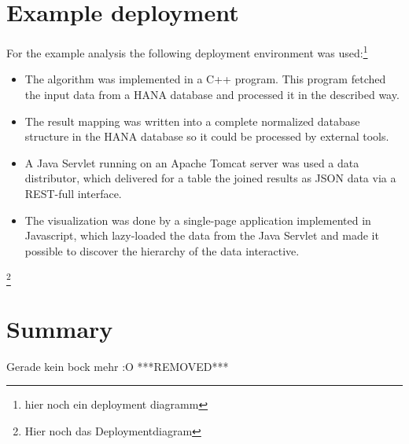 \documentclass[10pt, journal, twocolumn]{IEEEtran}
\begin{document}
\section{Example deployment}
For the example analysis the following deployment environment was used:\footnote{hier noch ein deployment diagramm}
\begin{itemize}
\item The algorithm was implemented in a C++ program. This program fetched the input data from a HANA database and processed it in the described way.
\item The result mapping was written into a complete normalized database structure in the HANA database so it could be processed by external tools.
\item A Java Servlet running on an Apache Tomcat server was used a data distributor, which delivered for a table the joined results as JSON data via a REST-full interface.
\item The visualization was done by a single-page application implemented in Javascript, which lazy-loaded the data from the Java Servlet and made it possible to discover the hierarchy of the data interactive.
\end{itemize}
\footnote{Hier noch das Deploymentdiagram }
\section{Summary}
Gerade kein bock mehr :O
***REMOVED***
\end{document}

